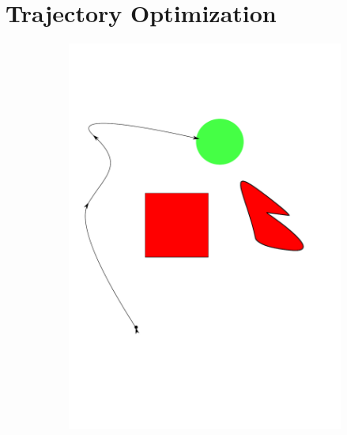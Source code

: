 \documentclass[../thesis.tex]{subfiles}
\begin{document}
\section{Trajectory Optimization} \label{sec:trajectory_optimization}

\begin{figure}
  \centering
  \begin{subfigure}[b]{0.24\linewidth}
    \includegraphics[width=\linewidth]{./Planning/trajectory_1.pdf}
  \end{subfigure}
  \hfill
  \begin{subfigure}[b]{0.24\linewidth}

\end{subfigure}
\end{figure}
\end{document}
